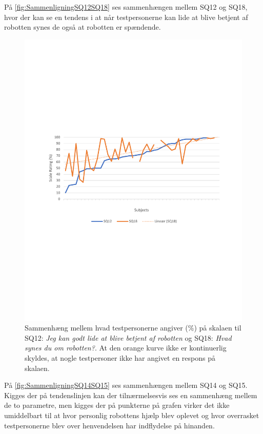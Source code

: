 På \autoref{fig:SammenligningSQ12SQ18} ses sammenhængen mellem SQ12 og SQ18, hvor der kan se en tendens i at når testpersonerne kan lide at blive betjent af robotten synes de også at robotten er spændende. 
%
\begin{figure}[H]
	\centering
	\includegraphics[width=\textwidth]{Figure/Korrelationsgrafer/SQ12+SQ18}
	\caption{Sammenhæng mellem hvad testpersonerne angiver (\%) på skalaen til SQ12: \textit{Jeg kan godt lide at blive betjent af robotten} og SQ18: \textit{Hvad synes du om robotten?}. At den orange kurve ikke er kontinuerlig skyldes, at nogle testpersoner ikke har angivet en respons på skalaen.}
	\label{fig:SammenligningSQ12SQ18}
\end{figure}
\noindent
%
På \autoref{fig:SammenligningSQ14SQ15} ses sammenhængen mellem SQ14 og SQ15. Kigges der på tendenslinjen kan der tilnærmelsesvis ses en sammenhæng mellem de to parametre, men kigges der på punkterne på grafen virker det ikke umiddelbart til at hvor personlig robottens hjælp blev oplevet og hvor overrasket testpersonerne blev over henvendelsen har indflydelse på hinanden.
